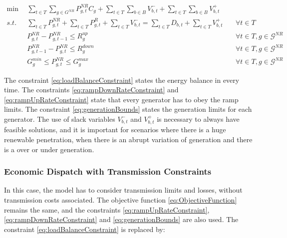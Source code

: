 \documentclass[12pt,LUDisStyle,twosided]{book}
\newcommand{\mc}{\mathcal}
\begin{document}
\begin{subequations}\label{model:simple_ED}
\begin{alignat}{4}
\min ~~& \sum_{t \in T}\sum_{g \in G^{NR}} P^{NR}_{g,t} C_{g} + \sum_{t \in T}\sum_{b \in B} V^{-}_{b,t} + \sum_{t \in T}\sum_{b \in B} V^{+}_{b,t} \label{eq:ObjectiveFunction} \\
s.t. ~~~& \sum_{t \in T} P^{NR}_{g,t} + \sum_{t \in T} P^{R}_{g,t} + \sum_{t \in T}V^{-}_{b,t} = \sum_{t \in T} D_{b,t}  + \sum_{t \in T}V^{+}_{b,t}  &~& \forall t \in T  \label{eq:loadBalanceConstraint} \\
& P^{NR}_{g,t} - P^{NR}_{g,t - 1} \leq R^{up}_{g} &~& \forall t \in T, g \in \mc{G}^{NR}\label{eq:rampUpRateConstraint} \\
& P^{NR}_{g,t -1 } - P^{NR}_{g,t} \leq R^{down}_{g} &~& \forall t \in T, g \in \mc{G}^{NR}\label{eq:rampDownRateConstraint} \\
& G^{min}_{g}\leq P^{NR}_{g,t} \leq G^{max}_{g} &~& \forall t \in T, g \in \mc{G}^{NR}\label{eq:generationBounds}
\end{alignat} 
\end{subequations}

The constraint \eqref{eq:loadBalanceConstraint} states the energy balance in every time. The constraints \eqref{eq:rampDownRateConstraint} and \eqref{eq:rampUpRateConstraint} state that every generator has to obey the ramp limits. The constraint \eqref{eq:generationBounds} states the generation limits for each generator. The use of slack variables $V^{-}_{b,t}$ and $V^{+}_{b,t}$ is necessary to always have feasible solutions, and it is important for scenarios where there is a huge renewable penetration, when there is an abrupt variation of generation and there is a over or under generation.   

\subsubsection{Economic Dispatch with Transmission Constraints}

In this case, the model has to consider transmission limits and losses, without transmission costs associated. The objective function \eqref{eq:ObjectiveFunction} remains the same, and the constraints \eqref{eq:rampUpRateConstraint}, \eqref{eq:rampDownRateConstraint} and \eqref{eq:generationBounds} are also used. The constraint \eqref{eq:loadBalanceConstraint} is replaced by:  

\end{document}
